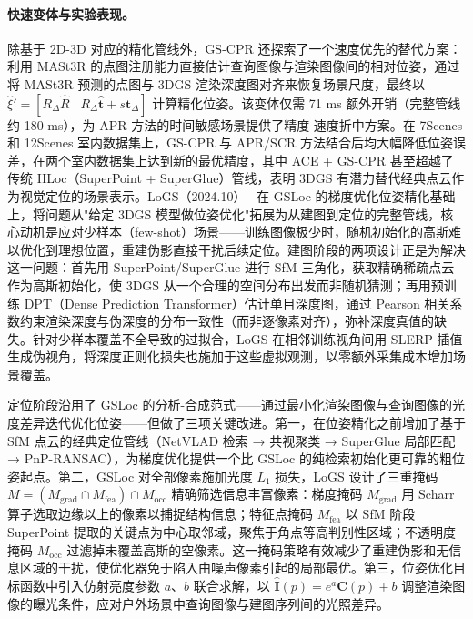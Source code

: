 \paragraph{快速变体与实验表现。}
除基于 2D-3D 对应的精化管线外，GS-CPR 还探索了一个速度优先的替代方案：利用 MASt3R 的点图注册能力直接估计查询图像与渲染图像间的相对位姿，通过将 MASt3R 预测的点图与 3DGS 渲染深度图对齐来恢复场景尺度，最终以 $\hat{\xi}' = [R_\Delta \hat{R} \mid R_\Delta \hat{\mathbf{t}} + s\mathbf{t}_\Delta]$ 计算精化位姿。该变体仅需 71 ms 额外开销（完整管线约 180 ms），为 APR 方法的时间敏感场景提供了精度-速度折中方案。在 7Scenes 和 12Scenes 室内数据集上，GS-CPR 与 APR/SCR 方法结合后均大幅降低位姿误差，在两个室内数据集上达到新的最优精度，其中 ACE + GS-CPR 甚至超越了传统 HLoc（SuperPoint + SuperGlue）管线，表明 3DGS 有潜力替代经典点云作为视觉定位的场景表示。LoGS（2024.10）~\cite{2410_11505} 在 GSLoc 的梯度优化位姿精化基础上，将问题从"给定 3DGS 模型做位姿优化"拓展为从建图到定位的完整管线，核心动机是应对少样本（few-shot）场景——训练图像极少时，随机初始化的高斯难以优化到理想位置，重建伪影直接干扰后续定位。建图阶段的两项设计正是为解决这一问题：首先用 SuperPoint/SuperGlue 进行 SfM 三角化，获取精确稀疏点云作为高斯初始化，使 3DGS 从一个合理的空间分布出发而非随机猜测；再用预训练 DPT（Dense Prediction Transformer）估计单目深度图，通过 Pearson 相关系数约束渲染深度与伪深度的分布一致性（而非逐像素对齐），弥补深度真值的缺失。针对少样本覆盖不全导致的过拟合，LoGS 在相邻训练视角间用 SLERP 插值生成伪视角，将深度正则化损失也施加于这些虚拟观测，以零额外采集成本增加场景覆盖。

定位阶段沿用了 GSLoc 的分析-合成范式——通过最小化渲染图像与查询图像的光度差异迭代优化位姿——但做了三项关键改进。第一，在位姿精化之前增加了基于 SfM 点云的经典定位管线（NetVLAD 检索 → 共视聚类 → SuperGlue 局部匹配 → PnP-RANSAC），为梯度优化提供一个比 GSLoc 的纯检索初始化更可靠的粗位姿起点。第二，GSLoc 对全部像素施加光度 $L_1$ 损失，LoGS 设计了三重掩码 $M = (M_{\text{grad}} \cap M_{\text{fea}}) \cap M_{\text{occ}}$ 精确筛选信息丰富像素：梯度掩码 $M_{\text{grad}}$ 用 Scharr 算子选取边缘以上的像素以捕捉结构信息；特征点掩码 $M_{\text{fea}}$ 以 SfM 阶段 SuperPoint 提取的关键点为中心取邻域，聚焦于角点等高判别性区域；不透明度掩码 $M_{\text{occ}}$ 过滤掉未覆盖高斯的空像素。这一掩码策略有效减少了重建伪影和无信息区域的干扰，使优化器免于陷入由噪声像素引起的局部最优。第三，位姿优化目标函数中引入仿射亮度参数 $a$、$b$ 联合求解，以 $\hat{\mathbf{I}}(p) = e^a \mathbf{C}(p) + b$ 调整渲染图像的曝光条件，应对户外场景中查询图像与建图序列间的光照差异。

